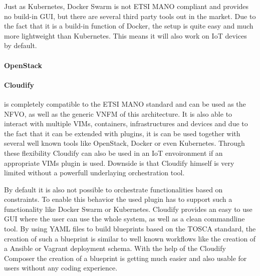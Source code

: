 Just as Kubernetes, Docker Swarm is not \ac{ETSI} \ac{MANO} compliant and provides no build-in \ac{GUI}, but there are several third party tools out in the market.
Due to the fact that it is a build-in function of Docker, the setup is quite easy and much more lightweight than Kubernetes.
This means it will also work on \ac{IoT} devices by default.

\paragraph{OpenStack}
\doit

\paragraph{Cloudify} is completely compatible to the \ac{ETSI} \ac{MANO} standard and can be used as the \ac{NFVO}, as well as the generic \ac{VNFM} of this architecture.\cite[cf.]{Cloudify:MANO}
It is also able to interact with multiple \acp{VIM}, containers, infrastructures and devices and due to the fact that it can be extended with plugins, it is can be used together with several well known tools like OpenStack, Docker or even Kubernetes.\cite[cf.]{Cloudify:MANO}
Through these flexibility Cloudify can also be used in an \ac{IoT} envoironment if an appropriate \acp{VIM} plugin is used.
Downside is that Cloudify himself is very limited without a powerfull underlaying orchestration tool.

By default it is also not possible to orchestrate functionalities based on constraints.
To enable this behavior the used plugin has to support such a functionality like Docker Swarm or Kubernetes.
Cloudify provides an easy to use \ac{GUI} where the user can use the whole system, as well as a clean commandline tool.
By using \ac{YAML} files to build blueprints based on the \ac{TOSCA} standard, the creation of such a blueprint is similar to well known workflows like the creation of a Ansible or Vagrant deployment schema.
With the help of the Cloudify Composer the creation of a blueprint is getting much easier and also usable for users without any coding experience.

